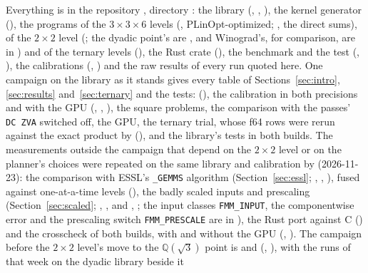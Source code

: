 \documentclass[11pt]{article}
\begin{document}
{\sloppy Everything is in the repository \cite{logic}, directory
: the library (, ,
), the kernel generator (), the programs
of the $3\times3\times6$ levels (, PLinOpt-optimized;
, the direct sums), of the $2\times2$ level
(; the dyadic point's are , and Winograd's, for comparison, are in
) and of the ternary levels
(), the Rust crate (), the benchmark and the
test (, ), the calibrations
(, ) and the raw
results of every run quoted here.  One campaign on the library as it
stands gives every table of Sections~\ref{sec:intro},
\ref{sec:results} and~\ref{sec:ternary} and the tests:
 (), the
calibration in both precisions and with the GPU (,
, ), the square problems, the comparison with the
passes' \texttt{DC~ZVA} switched off, the GPU, the ternary trial, whose f64 rows
were rerun against the exact product by 
(), and the library's tests in both builds.  The
measurements outside the campaign that depend on the $2\times2$ level or on the
planner's choices were repeated on the same library and calibration by
 (2026-11-23): the
comparison with ESSL's \texttt{\_GEMMS} algorithm (Section~\ref{sec:essl};
, ,
), fused against one-at-a-time
levels (), the badly scaled inputs
and prescaling (Section~\ref{sec:scaled}; ,
, and
, ;
the input classes \texttt{FMM\_INPUT}, the componentwise error and the
prescaling switch \texttt{FMM\_PRESCALE} are in ), the Rust port against C
() and the crosscheck of both builds, with and without the GPU
(, ).  The campaign before the
$2\times2$ level's move to the $\mathbb{Q}(\sqrt3)$ point is
 and 
(, ),
with the runs of that week on the dyadic library beside it
}
\end{document}
